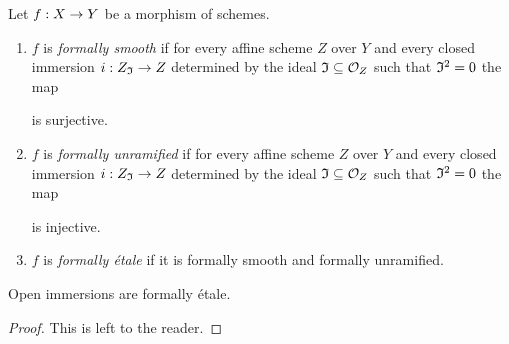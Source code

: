 \begin{definition}
Let $f:X\rightarrow Y$ be a morphism of schemes.
\begin{enumerate}[label=\textbf{(\arabic*)}, leftmargin=3.0em]
\item $f$ is \textit{formally smooth} if for every affine scheme $Z$ over $Y$ and every closed immersion $i:Z_{\mathfrak{I}}\rightarrow Z$ determined by the ideal $\mathfrak{I}\subseteq {\mathcal O}_Z$ such that $\mathfrak{I}^2=0$ the map
\begin{center}
\end{center}
is surjective.
\item $f$ is \textit{formally unramified}  if for every affine scheme $Z$ over $Y$ and every closed immersion $i:Z_{\mathfrak{I}}\rightarrow Z$ determined by the ideal $\mathfrak{I}\subseteq {\mathcal O}_Z$ such that $\mathfrak{I}^2=0$ the map
\begin{center}
\end{center}
is injective.
\item $f$ is \textit{formally {\'e}tale} if it is formally smooth and formally unramified.
\end{enumerate} 
\end{definition}

\begin{fact}\label{fact:open_immersions_are_formally_etale}
Open immersions are formally {\'e}tale.
\end{fact}
\begin{proof}
This is left to the reader.
\end{proof}

